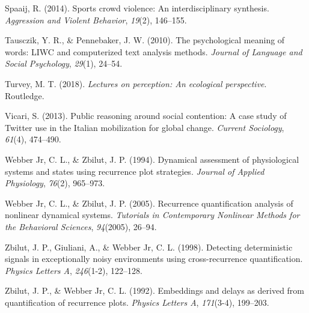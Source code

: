 \documentclass[english,man]{apa6}
\begin{document}
\leavevmode\hypertarget{ref-spaaij2014sports}{}%
Spaaij, R. (2014). Sports crowd violence: An interdisciplinary synthesis. \emph{Aggression and Violent Behavior}, \emph{19}(2), 146--155.

\leavevmode\hypertarget{ref-tausczik2010psychological}{}%
Tausczik, Y. R., \& Pennebaker, J. W. (2010). The psychological meaning of words: LIWC and computerized text analysis methods. \emph{Journal of Language and Social Psychology}, \emph{29}(1), 24--54.

\leavevmode\hypertarget{ref-turvey2018lectures}{}%
Turvey, M. T. (2018). \emph{Lectures on perception: An ecological perspective}. Routledge.

\leavevmode\hypertarget{ref-vicari2013public}{}%
Vicari, S. (2013). Public reasoning around social contention: A case study of Twitter use in the Italian mobilization for global change. \emph{Current Sociology}, \emph{61}(4), 474--490.

\leavevmode\hypertarget{ref-webber1994dynamical}{}%
Webber Jr, C. L., \& Zbilut, J. P. (1994). Dynamical assessment of physiological systems and states using recurrence plot strategies. \emph{Journal of Applied Physiology}, \emph{76}(2), 965--973.

\leavevmode\hypertarget{ref-webber2005recurrence}{}%
Webber Jr, C. L., \& Zbilut, J. P. (2005). Recurrence quantification analysis of nonlinear dynamical systems. \emph{Tutorials in Contemporary Nonlinear Methods for the Behavioral Sciences}, \emph{94}(2005), 26--94.

\leavevmode\hypertarget{ref-zbilut1998detecting}{}%
Zbilut, J. P., Giuliani, A., \& Webber Jr, C. L. (1998). Detecting deterministic signals in exceptionally noisy environments using cross-recurrence quantification. \emph{Physics Letters A}, \emph{246}(1-2), 122--128.

\leavevmode\hypertarget{ref-zbilut1992embeddings}{}%
Zbilut, J. P., \& Webber Jr, C. L. (1992). Embeddings and delays as derived from quantification of recurrence plots. \emph{Physics Letters A}, \emph{171}(3-4), 199--203.

\endgroup
\end{document}
